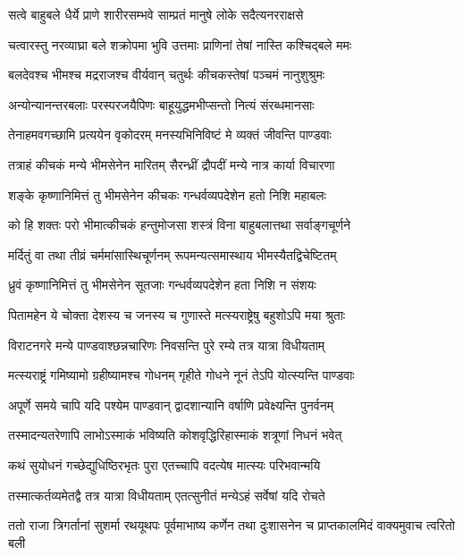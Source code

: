 \twolineshloka
{सत्वे बाहुबले धैर्ये प्राणे शारीरसम्भवे}
{साम्प्रतं मानुषे लोके सदैत्यनरराक्षसे}


\twolineshloka
{चत्वारस्तु नरव्याघ्रा बले शक्रोपमा भुवि}
{उत्तमाः प्राणिनां तेषां नास्ति कश्चिद्बले ममः}


\twolineshloka
{बलदेवश्च भीमश्च मद्रराजश्च वीर्यवान्}
{चतुर्थः कीचकस्तेषां पञ्चमं नानुशुश्रुमः}


\twolineshloka
{अन्योन्यानन्तरबलाः परस्परजयैपिणः}
{बाहूयुद्धमभीप्सन्तो नित्यं संरब्धमानसाः}


\twolineshloka
{तेनाहमवगच्छामि प्रत्ययेन वृकोदरम्}
{मनस्यभिनिविष्टं मे व्यक्तं जीवन्ति पाण्डवाः}


\twolineshloka
{तत्राहं कीचकं मन्ये भीमसेनेन मारितम्}
{सैरन्ध्रीं द्रौपदीं मन्ये नात्र कार्या विचारणा}


\twolineshloka
{शङ्के कृष्णानिमित्तं तु भीमसेनेन कीचकः}
{गन्धर्वव्यपदेशेन हतो निशि महाबलः}


\twolineshloka
{को हि शक्तः परो भीमात्कीचकं हन्तुमोजसा}
{शस्त्रं विना बाहुबलात्तथा सर्वाङ्गचूर्णने}


\twolineshloka
{मर्दितुं वा तथा तीव्रं चर्ममांसास्थिचूर्णनम्}
{रूपमन्यत्समास्थाय भीमस्यैतद्विचेष्टितम्}


\twolineshloka
{ध्रुवं कृष्णानिमित्तं तु भीमसेनेन सूतजाः}
{गन्धर्वव्यपदेशेन हता निशि न संशयः}


\twolineshloka
{पितामहेन ये चोक्ता देशस्य च जनस्य च}
{गुणास्ते मत्स्यराष्ट्रेषु बहुशोऽपि मया श्रुताः}


\twolineshloka
{विराटनगरे मन्ये पाण्डवाश्छन्नचारिणः}
{निवसन्ति पुरे रम्ये तत्र यात्रा विधीयताम्}


\twolineshloka
{मत्स्यराष्ट्रं गमिष्यामो ग्रहीष्यामश्च गोधनम्}
{गृहीते गोधने नूनं तेऽपि योत्स्यन्ति पाण्डवाः}


\twolineshloka
{अपूर्णे समये चापि यदि पश्येम पाण्डवान्}
{द्वादशान्यानि वर्षाणि प्रवेक्ष्यन्ति पुनर्वनम्}


\twolineshloka
{तस्मादन्यतरेणापि लाभोऽस्माकं भविष्यति}
{कोशवृद्धिरिहास्माकं शत्रूणां निधनं भवेत्}


\twolineshloka
{कथं सुयोधनं गच्छेद्युधिष्ठिरभृतः पुरा}
{एतच्चापि वदत्येष मात्स्यः परिभवान्मयि}


\twolineshloka
{तस्मात्कर्तव्यमेतद्वै तत्र यात्रा विधीयताम्}
{एतत्सुनीतं मन्येऽहं सर्वेषां यदि रोचते}



\threelineshloka
{ततो राजा त्रिगर्तानां सुशर्मा रथयूथपः}
{पूर्वमाभाष्य कर्णेन तथा दुःशासनेन च}
{प्राप्तकालमिदं वाक्यमुवाच त्वरितो बली}


